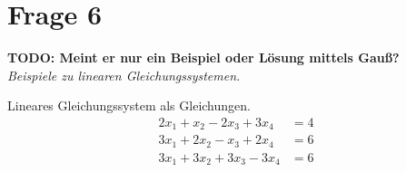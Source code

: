 \section{Frage 6}
\textbf{TODO: Meint er nur ein Beispiel oder Lösung mittels Gauß?}\\
\textit{Beispiele zu linearen Gleichungssystemen.}
\begin{example}
    Lineares Gleichungssystem als Gleichungen.
    \begin{align*}
        2x_1 + x_2 - 2x_3 + 3x_4 &= 4\\
        3x_1 + 2x_2 - x_3 + 2x_4 &= 6\\
        3x_1 + 3x_2 + 3x_3- 3x_4 &= 6
    \end{align*}
\end{example}